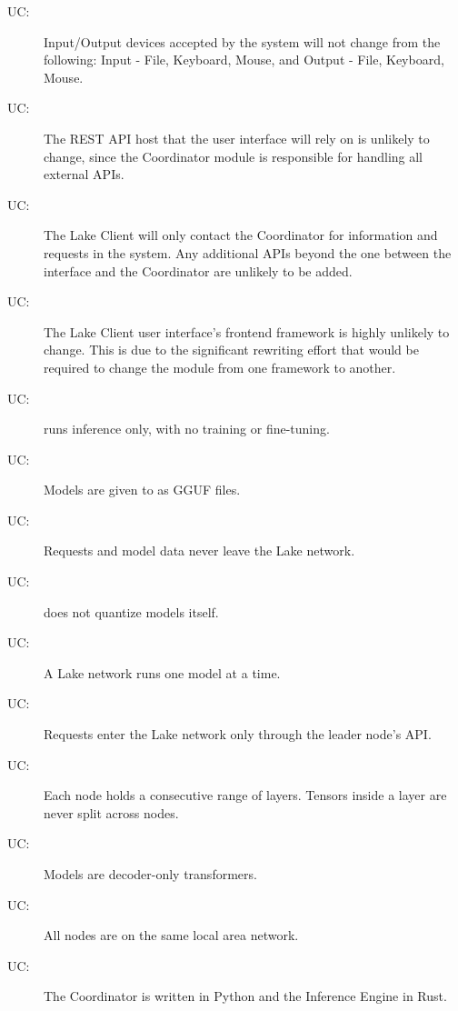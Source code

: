 \documentclass[12pt, titlepage]{article}
\newcounter{ucnum}
\newcommand{\uctheucnum}{UC\theucnum}
\begin{document}
\begin{description}
\item[ \uctheucnum \label{ucIO}:] Input/Output devices accepted
by the system will not change from the following: Input - File, Keyboard, Mouse, and Output - 
File, Keyboard, Mouse.
\item[ \uctheucnum \label{ucREST}:] The REST API host that the user
interface will rely on is unlikely to change, since the Coordinator module is responsible for handling all external APIs. 
\item[ \uctheucnum \label{ucOtherAPI}:] The Lake Client will only contact the Coordinator for
information and requests in the system. Any additional APIs beyond the one between the interface and the Coordinator 
are unlikely to be added.
\item[ \uctheucnum \label{ucFEFramework}:] The Lake Client user interface's frontend framework is highly unlikely to change.
This is due to the significant rewriting effort that would be required to change the module from one framework to another.
\item[ \uctheucnum \label{ucInference}:] \progname{} runs
  inference only, with no training or fine-tuning.
\item[ \uctheucnum \label{ucGGUF}:] Models are given to
  \progname{} as GGUF files.
\item[ \uctheucnum \label{ucLocal}:] Requests and model
  data never leave the Lake network.
\item[ \uctheucnum \label{ucQuant}:] \progname{} does not
  quantize models itself.
\item[ \uctheucnum \label{ucOneModel}:] A Lake network
  runs one model at a time.
\item[ \uctheucnum \label{ucEntry}:] Requests enter the
  Lake network only through the leader node's API.
\item[ \uctheucnum \label{ucPipeline}:] Each node holds a
  consecutive range of layers. Tensors inside a layer are never split across
  nodes.
\item[ \uctheucnum \label{ucDecoder}:] Models are
  decoder-only transformers.
\item[ \uctheucnum \label{ucLAN}:] All nodes are on the
  same local area network.
\item[ \uctheucnum \label{ucLang}:] The Coordinator is
  written in Python and the Inference Engine in Rust.
\end{description}
\end{document}
